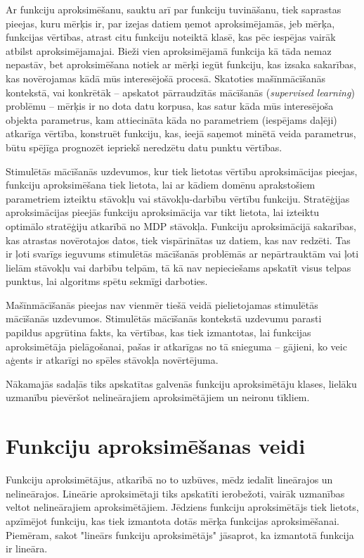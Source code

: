 \documentclass{ludis} %
\begin{document}
Ar funkciju aproksimēšanu, sauktu arī par funkciju tuvināšanu, tiek saprastas
pieejas, kuru mērķis ir, par izejas datiem ņemot aproksimējamās, jeb mērķa,
funkcijas vērtības, atrast citu funkciju noteiktā klasē, kas pēc iespējas vairāk
atbilst aproksimējamajai. Bieži vien aproksimējamā funkcija kā tāda nemaz
nepastāv, bet aproksimēšana notiek ar mērķi iegūt funkciju, kas izsaka
sakarības, kas novērojamas kādā mūs interesējošā procesā. Skatoties
mašīnmācīšanās kontekstā, vai konkrētāk -- apskatot pārraudzītās mācīšanās
(\textit{supervised learning}) problēmu -- mērķis ir no dota datu korpusa, kas
satur kāda mūs interesējoša objekta parametrus, kam attiecināta kāda no
parametriem (iespējams daļēji) atkarīga vērtība, konstruēt funkciju, kas, ieejā
saņemot minētā veida parametrus, būtu spējīga prognozēt iepriekš neredzētu datu
punktu vērtības.

Stimulētās mācīšanās uzdevumos, kur tiek lietotas vērtību aproksimācijas
pieejas, funkciju aproksimēšana tiek lietota, lai ar kādiem domēnu aprakstošiem
parametriem izteiktu stāvokļu vai stāvokļu-darbību vērtību funkciju. Stratēģijas
aproksimācijas pieejās funkciju aproksimācija var tikt lietota, lai izteiktu
optimālo stratēģiju atkarībā no MDP stāvokļa. Funkciju aproksimācijā sakarības,
kas atrastas novērotajos datos, tiek vispārinātas uz datiem, kas nav redzēti.
Tas ir ļoti svarīgs ieguvums stimulētās mācīšanās problēmās ar nepārtrauktām vai
ļoti lielām stāvokļu vai darbību telpām, tā kā nav nepieciešams apskatīt visus
telpas punktus, lai algoritms spētu sekmīgi darboties.

Mašīnmācīšanās pieejas nav vienmēr tiešā veidā pielietojamas stimulētās
mācīšanās uzdevumos. Stimulētās mācīšanās kontekstā uzdevumu parasti papildus
apgrūtina fakts, ka vērtības, kas tiek izmantotas, lai funkcijas aproksimētāja
pielāgošanai, pašas ir atkarīgas no tā snieguma -- gājieni, ko veic aģents ir
atkarīgi no spēles stāvokļa novērtējuma.

Nākamajās sadaļās tiks apskatītas galvenās funkciju aproksimētāju klases,
lielāku uzmanību pievēršot nelineārajiem aproksimētājiem un neironu tīkliem.

\section{Funkciju aproksimēšanas veidi}
Funkciju aproksimētājus, atkarībā no to uzbūves, mēdz iedalīt lineārajos un
nelineārajos. Lineārie aproksimētaji tiks apskatīti ierobežoti, vairāk uzmanības
veltot nelineārajiem aproksimētājiem. Jēdziens funkciju aproksimētājs tiek
lietots, apzīmējot funkciju, kas tiek izmantota dotās mērķa funkcijas
aproksimēšanai. Piemēram, sakot "lineārs funkciju aproksimētājs" jāsaprot, ka
izmantotā funkcija ir lineāra.
\end{document}
